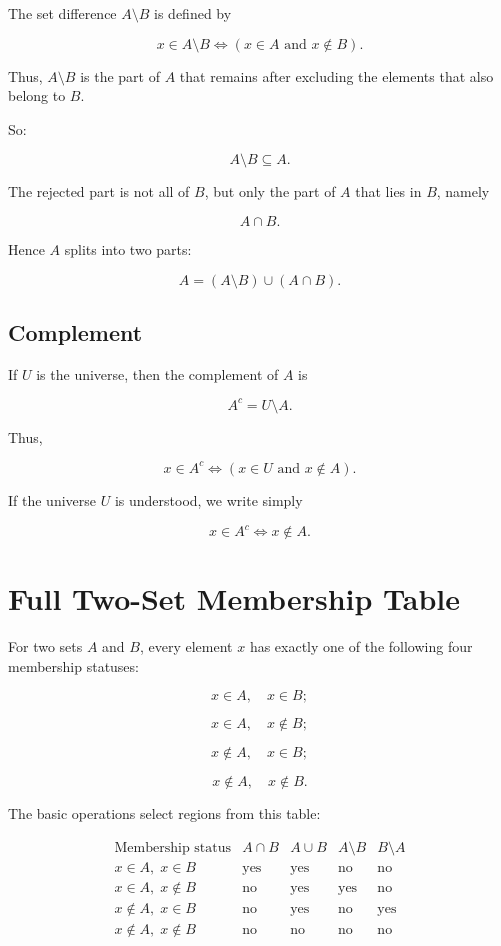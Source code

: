 \documentclass{article}
\begin{document}
	The set difference $A \setminus B$ is defined by
	
	$$
	x \in A \setminus B
	\iff
	(x \in A \text{ and } x \notin B).
	$$
	
	Thus, $A \setminus B$ is the part of $A$ that remains after excluding the elements that also belong to $B$.
	
	So:
	
	$$
	A \setminus B \subseteq A.
	$$
	
	The rejected part is not all of $B$, but only the part of $A$ that lies in $B$, namely
	
	$$
	A \cap B.
	$$
	
	Hence $A$ splits into two parts:
	
	$$
	A = (A \setminus B) \cup (A \cap B).
	$$
	
	\subsection{Complement}
	
	If $U$ is the universe, then the complement of $A$ is
	
	$$
	A^{c} = U \setminus A.
	$$
	
	Thus,
	
	$$
	x \in A^{c}
	\iff
	(x \in U \text{ and } x \notin A).
	$$
	
	If the universe $U$ is understood, we write simply
	
	$$
	x \in A^{c}
	\iff
	x \notin A.
	$$
	
	\section{Full Two-Set Membership Table}
	
	For two sets $A$ and $B$, every element $x$ has exactly one of the following four membership statuses:
	
	$$
	x \in A,\quad x \in B;
	$$
	
	$$
	x \in A,\quad x \notin B;
	$$
	
	$$
	x \notin A,\quad x \in B;
	$$
	
	$$
	x \notin A,\quad x \notin B.
	$$
	
	The basic operations select regions from this table:
	
	$$
	\begin{array}{c|c|c|c|c}
		\text{Membership status} & A \cap B & A \cup B & A \setminus B & B \setminus A \\
		\hline
		x \in A,\; x \in B & \text{yes} & \text{yes} & \text{no} & \text{no} \\
		x \in A,\; x \notin B & \text{no} & \text{yes} & \text{yes} & \text{no} \\
		x \notin A,\; x \in B & \text{no} & \text{yes} & \text{no} & \text{yes} \\
		x \notin A,\; x \notin B & \text{no} & \text{no} & \text{no} & \text{no}
	\end{array}
	$$
	
\end{document}
